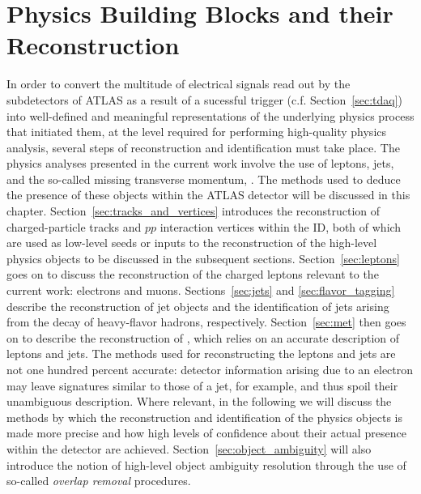 \chapter{Physics Building Blocks and their Reconstruction}
\label{chap:objects}

In order to convert the multitude of electrical signals read out by the subdetectors
of ATLAS as a result of a sucessful trigger (c.f. Section~\ref{sec:tdaq})
into well-defined and meaningful representations of the underlying physics process
that initiated them, at the level required for performing high-quality physics analysis,
several steps of reconstruction and identification must take place.
The physics analyses presented in the current work involve the use of leptons,
jets, and the so-called missing transverse momentum, \ptmiss.
The methods used to deduce the presence of these objects within the ATLAS detector
will be discussed in this chapter.
Section~\ref{sec:tracks_and_vertices} introduces the reconstruction of charged-particle
tracks and $pp$ interaction vertices within the ID, both of which are used as low-level seeds or inputs to the
reconstruction of the high-level physics objects to be discussed in the subsequent
sections.
Section~\ref{sec:leptons} goes on to discuss the reconstruction of the charged leptons
relevant to the current work: electrons and muons.
Sections~\ref{sec:jets} and \ref{sec:flavor_tagging} describe the reconstruction
of jet objects and the identification of jets arising from the decay of heavy-flavor hadrons,
respectively.
Section~\ref{sec:met} then goes on to describe the reconstruction of \ptmiss,
which relies on an accurate description of leptons and jets.
The methods used for reconstructing the leptons and jets are not one hundred percent
accurate: detector information arising due to an electron may leave signatures
similar to those of a jet, for example, and thus spoil their unambiguous description.
Where relevant, in the following we will discuss the methods by which the reconstruction
and identification of the physics objects is made more precise and how high levels
of confidence about their actual presence within the detector are achieved.
Section~\ref{sec:object_ambiguity} will also introduce the notion of high-level
object ambiguity resolution through the use of so-called \textit{overlap removal}
procedures.



